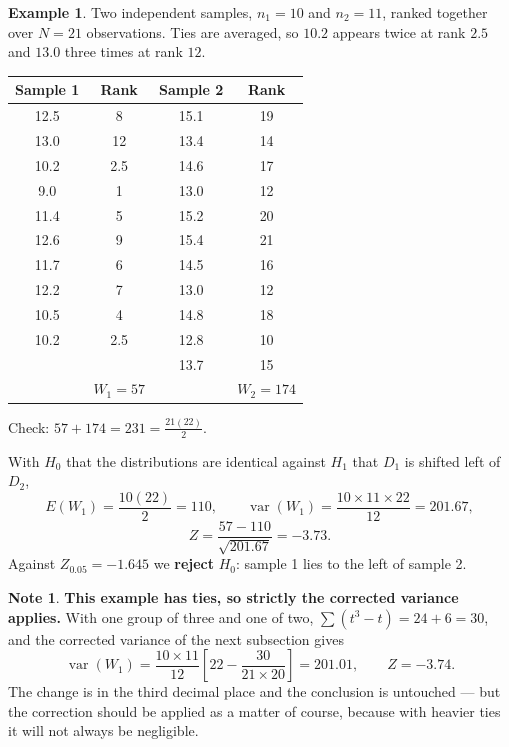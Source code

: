 \documentclass[11pt,a4paper]{article}
\theoremstyle{definition}
\newtheorem{example}[thm]{Example}
\newtheorem{note}[thm]{Note}
\begin{document}
\begin{example}
Two independent samples, $n_1 = 10$ and $n_2 = 11$, ranked together over
$N = 21$ observations. Ties are averaged, so $10.2$ appears twice at rank $2.5$
and $13.0$ three times at rank $12$.

\begin{center}
\begin{tabular}{cc|cc}
Sample 1 & Rank & Sample 2 & Rank\\
\hline
12.5 & 8   & 15.1 & 19\\
13.0 & 12  & 13.4 & 14\\
10.2 & 2.5 & 14.6 & 17\\
9.0  & 1   & 13.0 & 12\\
11.4 & 5   & 15.2 & 20\\
12.6 & 9   & 15.4 & 21\\
11.7 & 6   & 14.5 & 16\\
12.2 & 7   & 13.0 & 12\\
10.5 & 4   & 14.8 & 18\\
10.2 & 2.5 & 12.8 & 10\\
     &     & 13.7 & 15\\
\hline
 & $W_1 = 57$ & & $W_2 = 174$\\
\hline
\end{tabular}
\end{center}
Check: $57 + 174 = 231 = \frac{21(22)}{2}$.

With $H_0$ that the distributions are identical against $H_1$ that $D_1$ is shifted
left of $D_2$,
$$E(W_1) = \dfrac{10(22)}{2} = 110,
\qquad
\operatorname{var}(W_1) = \dfrac{10 \times 11 \times 22}{12} = 201.67,$$
$$Z = \dfrac{57-110}{\sqrt{201.67}} = -3.73 .$$
Against $Z_{0.05} = -1.645$ we \textbf{reject} $H_0$: sample 1 lies to the left of
sample 2.
\end{example}

\begin{note}
\textbf{This example has ties, so strictly the corrected variance applies.} With
one group of three and one of two, $\sum(t^{3}-t) = 24 + 6 = 30$, and the corrected
variance of the next subsection gives
$$\operatorname{var}(W_1) = \dfrac{10 \times 11}{12}
\left[22 - \dfrac{30}{21 \times 20}\right] = 201.01,
\qquad Z = -3.74 .$$
The change is in the third decimal place and the conclusion is untouched --- but the
correction should be applied as a matter of course, because with heavier ties it
will not always be negligible.
\end{note}
\end{document}
